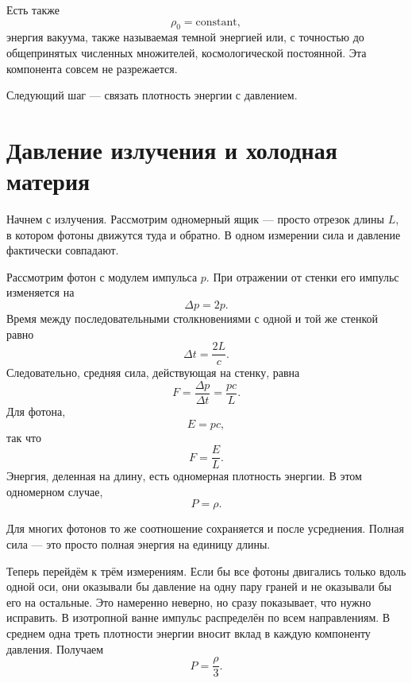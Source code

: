Есть также
\begin{equation}
\rho_0=\text{constant},
\end{equation}
энергия вакуума, также называемая темной энергией или, с точностью до общепринятых численных множителей, космологической постоянной. Эта компонента совсем не разрежается.

Следующий шаг — связать плотность энергии с давлением.

\section{Давление излучения и холодная материя}

Начнем с излучения. Рассмотрим одномерный ящик — просто отрезок длины \(L\), в котором фотоны движутся туда и обратно. В одном измерении сила и давление фактически совпадают.

Рассмотрим фотон с модулем импульса \(p\). При отражении от стенки его импульс изменяется на
\begin{equation}
\Delta p = 2p.
\end{equation}
Время между последовательными столкновениями с одной и той же стенкой равно
\begin{equation}
\Delta t = \frac{2L}{c}.
\end{equation}
Следовательно, средняя сила, действующая на стенку, равна
\begin{equation}
F=\frac{\Delta p}{\Delta t}=\frac{pc}{L}.
\end{equation}
Для фотона,
\begin{equation}
E=pc,
\end{equation}
так что
\begin{equation}
F=\frac{E}{L}.
\end{equation}
Энергия, деленная на длину, есть одномерная плотность энергии. В этом одномерном случае,
\begin{equation}
P=\rho .
\end{equation}

Для многих фотонов то же соотношение сохраняется и после усреднения. Полная сила — это просто полная энергия на единицу длины.

Теперь перейдём к трём измерениям. Если бы все фотоны двигались только вдоль одной оси, они оказывали бы давление на одну пару граней и не оказывали бы его на остальные. Это намеренно неверно, но сразу показывает, что нужно исправить. В изотропной ванне импульс распределён по всем направлениям. В среднем одна треть плотности энергии вносит вклад в каждую компоненту давления. Получаем
\begin{equation}
P=\frac{\rho}{3}.
\end{equation}

